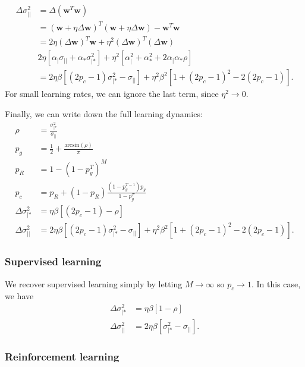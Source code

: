 \documentclass{article}
\renewcommand\b\bm
\begin{document}
\begin{align}
    \label{eq:stud_change}
    \Delta \sigma_{||}^2 &= \Delta (\b{w}^T \b{w})\\
    &= (\b{w} + \eta \Delta \b{w})^T (\b{w} + \eta \Delta \b{w}) - \b{w}^T \b{w}\\
    &= 2 \eta (\Delta \b{w})^T \b{w} + \eta^2 (\Delta \b{w})^T (\Delta \b{w}) \\
    & 2 \eta \left [ \alpha_| \sigma_{||} + \alpha_* \sigma_{|*}^2 \right ] + \eta^2 \left [ \alpha_|^2 + \alpha_*^2 + 2 \alpha_| \alpha_* \rho \right ] \\
    &= 2 \eta \beta \left [  (2 p_c - 1) \sigma_{|*}^2 - \sigma_{||} \right ] + \eta^2 \beta^2 \left [  1  + (2p_c - 1)^2 - 2 (2 p_c - 1) \right ].
\end{align}
For small learning rates, we can ignore the last term, since $\eta^2 \rightarrow 0$.

Finally, we can write down the full learning dynamics:
\begin{align}
    \rho &= \frac{\sigma_{|*}^2}{\sigma_{||}}\\
    p_g &= \frac{1}{2} + \frac{\text{arcsin}(\rho)}{\pi}\\
    p_R &= 1 - (1 - p_g^T)^M\\
    p_c &= p_R + (1-p_R) \frac{(1 - p_g^{T-1}) p_g}{1 - p_g^T}\\
    \Delta \sigma_{|*}^2 &= \eta \beta \left [  (2 p_c - 1) - \rho \right ]\\
    \Delta \sigma_{||}^2 &= 2 \eta \beta \left [  (2 p_c - 1) \sigma_{|*}^2 - \sigma_{||} \right ] + \eta^2 \beta^2 \left [  1  + (2p_c - 1)^2 - 2 (2 p_c - 1) \right ].
\end{align}

\subsubsection*{Supervised learning}

We recover supervised learning simply by letting $M \rightarrow \infty$ so $p_c \rightarrow 1$.
In this case, we have
\begin{align}
    \Delta \sigma_{|*}^2 &= \eta \beta \left [  1 - \rho \right ]\\
    \Delta \sigma_{||}^2 &= 2 \eta \beta \left [  \sigma_{|*}^2 - \sigma_{||} \right ].
\end{align}

\subsubsection*{Reinforcement learning}
\end{document}
